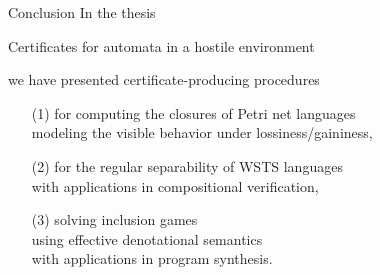 \documentclass[../talk.tex]{subfiles}
\begin{document}
\begin{frame}{Conclusion}
        In the thesis

        \begin{center}
            \alert{Certificates for automata in a hostile environment}
        \end{center}

        we have presented \alert{certificate-producing} procedures
        \begin{itemize}
            \item[(1)]
                for computing the \alert{closures} of Petri net languages
                \\
                \quad modeling the visible behavior under lossiness/gaininess,
            \item[(2)] for the \alert{regular separability} of WSTS languages
                \\
                \quad with applications in compositional verification,
                \\
            \item[(3)] solving \alert{inclusion games}
                \\
                \quad using effective denotational semantics
                \\
                \quad with applications in program synthesis.
        \end{itemize}
\end{frame}
\end{document}
